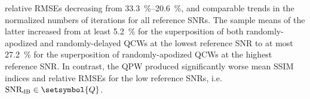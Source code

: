 %
relative \acp{RMSE} decreasing from
\SIrange{33.3}{20.6}{\percent}, and
comparable trends in
the normalized numbers of
iterations for
all reference \acp{SNR}.
%
The sample means of
the latter increased from
at least \SI{5.2}{\percent} for
the superposition of both
randomly-apodized and
randomly-delayed \acp{QCW} at
the lowest reference \ac{SNR} to
at most \SI{27.2}{\percent} for
the superposition of
randomly-apodized \acp{QCW} at
the highest reference \ac{SNR}.
In contrast,
the \ac{QPW} produced
significantly worse
mean \ac{SSIM} indices and
relative \acp{RMSE} for
the low reference \acp{SNR}, i.e.
$\text{SNR}_{\text{dB}} \in \setsymbol{Q}$.
